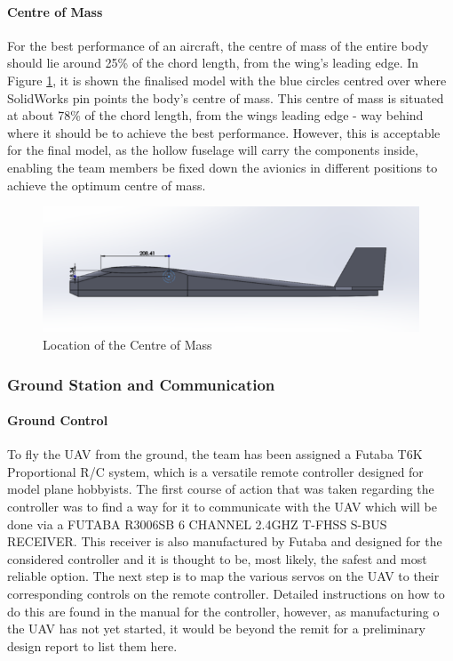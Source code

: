 \documentclass[12pt]{article}
\begin{document}
\paragraph{Centre of Mass} For the best performance of an aircraft, the centre of mass of the entire body should lie around 25\% of the chord length, from the wing's leading edge. In Figure \ref{masscentre}, it is shown the finalised model with the blue circles centred over where SolidWorks pin points the body’s centre of mass. This centre of mass is situated at about 78\% of the chord length, from the wings leading edge - way behind where it should be to achieve the best performance. However, this is acceptable for the final model, as the hollow fuselage will carry the components inside, enabling the team members be fixed down the avionics in different positions to achieve the optimum centre of mass. 

\begin{figure}
\includegraphics{centremass.png}
\caption{Location of the Centre of Mass}
\label{masscentre}
\end{figure}

\subsubsection{Ground Station and Communication}

\paragraph{Ground Control} To fly the UAV from the ground, the team has been assigned a Futaba T6K Proportional R/C system, which is a versatile remote controller designed for model plane hobbyists. The first course of action that was taken regarding the controller was to find a way for it to communicate with the UAV which will be done via a FUTABA R3006SB 6 CHANNEL 2.4GHZ T-FHSS S-BUS RECEIVER. This receiver is also manufactured by Futaba and designed for the considered controller and it is thought to be, most likely, the safest and most reliable option. The next step is to map the various servos on the UAV to their corresponding controls on the remote controller. Detailed instructions on how to do this are found in the manual for the controller, however, as manufacturing o the UAV has not yet started, it would be beyond the remit for a preliminary design report to list them here. \\
\end{document}
